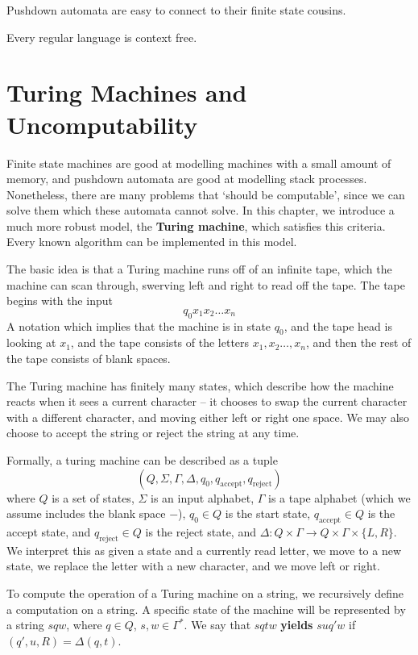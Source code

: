 Pushdown automata are easy to connect to their finite state cousins.

\begin{corollary}
    Every regular language is context free.
\end{corollary}



\chapter{Turing Machines and Uncomputability}

Finite state machines are good at modelling machines with a small amount of memory, and pushdown automata are good at modelling stack processes. Nonetheless, there are many problems that `should be computable', since we can solve them which these automata cannot solve. In this chapter, we introduce a much more robust model, the {\bf Turing machine}, which satisfies this criteria. Every known algorithm can be implemented in this model.

The basic idea is that a Turing machine runs off of an infinite tape, which the machine can scan through, swerving left and right to read off the tape. The tape begins with the input
%
\[ q_0 x_1 x_2 \dots x_n \]
%
A notation which implies that the machine is in state $q_0$, and the tape head is looking at $x_1$, and the tape consists of the letters $x_1, x_2 \dots, x_n$, and then the rest of the tape consists of blank spaces.

The Turing machine has finitely many states, which describe how the machine reacts when it sees a current character -- it chooses to swap the current character with a different character, and moving either left or right one space. We may also choose to accept the string or reject the string at any time.

Formally, a turing machine can be described as a tuple
%
\[ (Q, \Sigma, \Gamma, \Delta, q_0, q_{\text{accept}}, q_{\text{reject}}) \]
%
where $Q$ is a set of states, $\Sigma$ is an input alphabet, $\Gamma$ is a tape alphabet (which we assume includes the blank space $-$), $q_0 \in Q$ is the start state, $q_{\text{accept}} \in Q$ is the accept state, and $q_{\text{reject}} \in Q$ is the reject state, and $\Delta: Q \times \Gamma \to Q \times \Gamma \times \{ L , R \}$. We interpret this as given a state and a currently read letter, we move to a new state, we replace the letter with a new character, and we move left or right.

To compute the operation of a Turing machine on a string, we recursively define a computation on a string. A specific state of the machine will be represented by a string $sqw$, where $q \in Q$, $s,w \in \Gamma^*$. We say that $sqtw$ {\bf yields} $suq'w$ if $(q', u, R) = \Delta(q,t)$.

